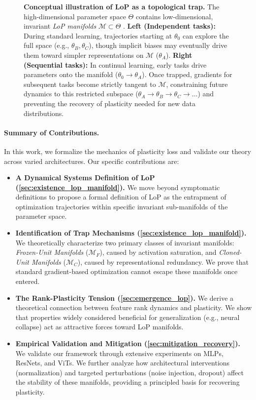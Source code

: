 \documentclass{article}
\numberwithin{figure}{section}
\begin{document}
\begin{figure}[t]
    \caption{\textbf{Conceptual illustration of LoP as a topological trap.} The high-dimensional parameter space $\Theta$ contains low-dimensional, invariant \emph{LoP manifolds} $\mathcal{M}\subset \Theta$ . \textbf{Left (Independent tasks):} During standard learning, trajectories starting at $\theta_0$ can explore the full space (e.g., $\theta_B, \theta_C$), though implicit biases may eventually drive them toward simpler representations on $\mathcal{M}$ ($\theta_A$). \textbf{Right (Sequential tasks):} In continual learning, early tasks drive parameters onto the manifold ($\theta_0 \to \theta_A$). Once trapped, gradients for subsequent tasks become strictly tangent to $\mathcal{M}$, constraining future dynamics to this restricted subspace ($\theta_A \to \theta_B \to \theta_C\to\dots $) and preventing the recovery of plasticity needed for new data distributions.}
    \label{fig:concept_lop_trap}
\end{figure}

\paragraph{Summary of Contributions.}
In this work, we formalize the mechanics of plasticity loss and validate our theory across varied architectures. Our specific contributions are:
\begin{itemize}[leftmargin=*]
    \item \textbf{A Dynamical Systems Definition of LoP (\cref{sec:existence_lop_manifold}).} We move beyond symptomatic definitions to propose a formal definition of LoP as the entrapment of optimization trajectories within specific invariant sub-manifolds of the parameter space.
    \item \textbf{Identification of Trap Mechanisms (\cref{sec:existence_lop_manifold}).} We theoretically characterize two primary classes of invariant manifolds: \textit{Frozen-Unit Manifolds} ($\mathcal{M}_F$), caused by activation saturation, and \textit{Cloned-Unit Manifolds} ($\mathcal{M}_C$), caused by representational redundancy. We prove that standard gradient-based optimization cannot escape these manifolds once entered.
    \item \textbf{The Rank-Plasticity Tension (\cref{sec:emergence_lop}).} We derive a theoretical connection between feature rank dynamics and plasticity. We show that properties widely considered beneficial for generalization (e.g., neural collapse) act as attractive forces toward LoP manifolds.
    \item \textbf{Empirical Validation and Mitigation (\cref{sec:mitigation_recovery}).} We validate our framework through extensive experiments on MLPs, ResNets, and ViTs. We further analyze how architectural interventions (normalization) and targeted perturbations (noise injection, dropout) affect the stability of these manifolds, providing a principled basis for recovering plasticity.
\end{itemize}
\end{document}
